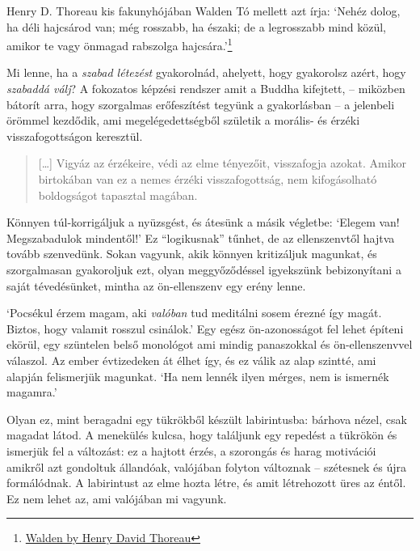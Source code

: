 \clearpage
\normalpagelayout

Henry D. Thoreau kis fakunyhójában Walden Tó mellett azt írja: `Nehéz
dolog, ha déli hajcsárod van; még rosszabb, ha északi; de a legrosszabb
mind közül, amikor te vagy önmagad rabszolga hajcsára.'\footnote{\href{https://www.goodreads.com/book/show/16902.Walden}{Walden
  by Henry David Thoreau}}

Mi lenne, ha a \emph{szabad létezést} gyakorolnád, ahelyett, hogy
gyakorolsz azért, hogy \emph{szabaddá válj}? A fokozatos képzési
rendszer amit a Buddha kifejtett, -- miközben bátorít arra, hogy
szorgalmas erőfeszítést tegyünk a gyakorlásban -- a jelenbeli örömmel
kezdődik, ami megelégedettségből születik a morális- és érzéki
visszafogottságon keresztül.

\begin{quote}
{[}\ldots{]} Vigyáz az érzékeire, védi az elme tényezőit, visszafogja
azokat. Amikor birtokában van ez a nemes érzéki visszafogottság, nem
kifogásolható boldogságot tapasztal magában.

\bigskip

\end{quote}


Könnyen túl-korrigáljuk a nyüzsgést, és átesünk a másik végletbe:
`Elegem van! Megszabadulok mindentől!' Ez ``logikusnak'' tűnhet, de az
ellenszenvtől hajtva tovább szenvedünk. Sokan vagyunk, akik könnyen
kritizáljuk magunkat, és szorgalmasan gyakoroljuk ezt, olyan
meggyőződéssel igyekszünk bebizonyítani a saját tévedésünket, mintha az
ön-ellenszenv egy erény lenne.

`Pocsékul érzem magam, aki \emph{valóban} tud meditálni sosem érezné így
magát. Biztos, hogy valamit rosszul csinálok.' Egy egész ön-azonosságot
fel lehet építeni ekörül, egy szüntelen belső monológot ami mindig
panaszokkal és ön-ellenszenvvel válaszol. Az ember évtizedeken át élhet
így, és ez válik az alap szintté, ami alapján felismerjük magunkat. `Ha
nem lennék ilyen mérges, nem is ismernék magamra.'

Olyan ez, mint beragadni egy tükrökből készült labirintusba: bárhova
nézel, csak magadat látod. A menekülés kulcsa, hogy találjunk egy
repedést a tükrökön és ismerjük fel a változást: ez a hajtott érzés, a
szorongás és harag motivációi amikről azt gondoltuk állandóak, valójában
folyton változnak -- szétesnek és újra formálódnak. A labirintust az
elme hozta létre, és amit létrehozott üres az éntől. Ez nem lehet az,
ami valójában mi vagyunk.

